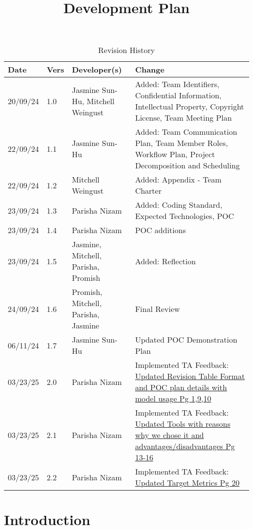\documentclass{article}
\title{Development Plan\\\progname}
\author{\authname}
\date{}
\begin{document}
\maketitle

\begin{table}[hp]
\caption{Revision History} \label{TblRevisionHistory}
\begin{tabularx}{\textwidth}{p{1.3cm}p{1cm}p{3cm}X}
\toprule
\textbf{Date} & \textbf{Vers} & \textbf{Developer(s)} & \textbf{Change}\\
\midrule
20/09/24 & 1.0 & Jasmine Sun-Hu, Mitchell Weingust & Added: Team Identifiers, Confidential Information, Intellectual Property,
Copyright License, Team Meeting Plan\\
22/09/24 & 1.1 & Jasmine Sun-Hu & Added: Team Communication Plan, Team Member Roles, Workflow Plan, Project Decomposition and Scheduling\\
22/09/24 & 1.2 & Mitchell Weingust & Added: Appendix - Team Charter\\
23/09/24 & 1.3 & Parisha Nizam & Added: Coding Standard, Expected Technologies, POC \\
23/09/24 & 1.4 & Parisha Nizam & POC additions \\
23/09/24 & 1.5 & Jasmine, Mitchell, Parisha, Promish & Added: Reflection \\
24/09/24 & 1.6 & Promish, Mitchell, Parisha, Jasmine & Final Review\\
06/11/24 & 1.7 & Jasmine Sun-Hu & Updated POC Demonstration Plan\\
03/23/25 & 2.0 & Parisha Nizam & Implemented TA Feedback: \href{https://github.com/parishanizam/TeleHealth/issues/185}{Updated Revision Table Format and POC plan details with model usage Pg 1,9,10} \\
03/23/25 & 2.1 & Parisha Nizam & Implemented TA Feedback: \href{https://github.com/parishanizam/TeleHealth/issues/180}{Updated Tools with reasons why we chose it and advantages/disadvantages Pg 13-16}\\
03/23/25 & 2.2 & Parisha Nizam & Implemented TA Feedback: \href{https://github.com/parishanizam/TeleHealth/issues/235}{Updated Target Metrics Pg 20}\\
\bottomrule
\end{tabularx}
\end{table}

\newpage{}

\section*{Introduction}
\end{document}
